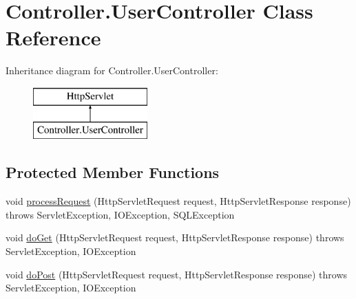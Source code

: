 \hypertarget{class_controller_1_1_user_controller}{}\section{Controller.\+User\+Controller Class Reference}
\label{class_controller_1_1_user_controller}
Inheritance diagram for Controller.\+User\+Controller\+:\begin{figure}[H]
\begin{center}
\leavevmode
\includegraphics[height=2.000000cm]{class_controller_1_1_user_controller}
\end{center}
\end{figure}
\subsection*{Protected Member Functions}
\begin{DoxyCompactItemize}
\item 
void \mbox{\hyperlink{class_controller_1_1_user_controller_a1b47c766fe3988c5e52b0f1ae0e506db}{process\+Request}} (Http\+Servlet\+Request request, Http\+Servlet\+Response response)  throws Servlet\+Exception, I\+O\+Exception, S\+Q\+L\+Exception 
\item 
void \mbox{\hyperlink{class_controller_1_1_user_controller_a8238459bce03a923af753206e22e3096}{do\+Get}} (Http\+Servlet\+Request request, Http\+Servlet\+Response response)  throws Servlet\+Exception, I\+O\+Exception 
\item 
void \mbox{\hyperlink{class_controller_1_1_user_controller_a74a8b03f608cf52dded94ff373bc7d10}{do\+Post}} (Http\+Servlet\+Request request, Http\+Servlet\+Response response)  throws Servlet\+Exception, I\+O\+Exception 
\end{DoxyCompactItemize}
